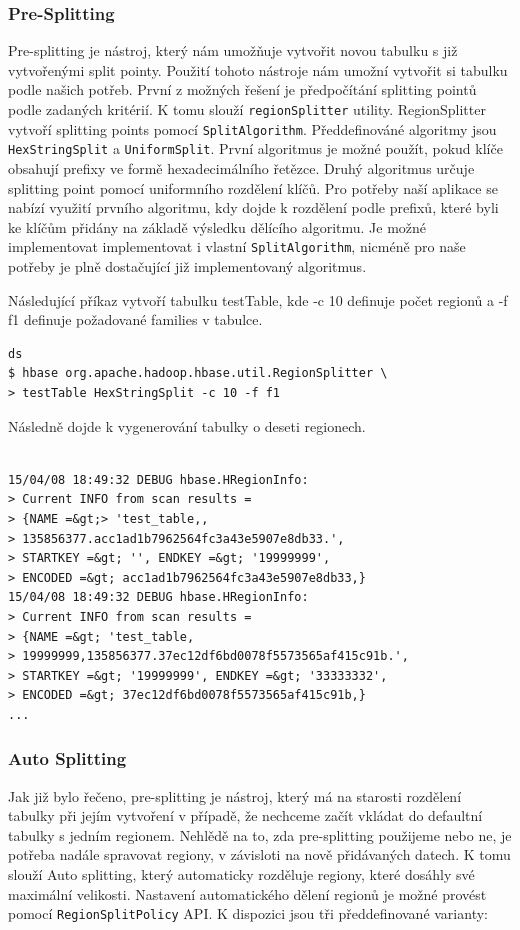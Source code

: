 \documentclass[thesis=M,czech]{FITthesis}[2012/06/26]
\begin{document}
\subsubsection{Pre-Splitting}
Pre-splitting je nástroj, který nám umožňuje vytvořit novou tabulku s již vytvořenými split pointy. Použití tohoto nástroje nám umožní vytvořit si tabulku podle našich potřeb. První z možných řešení je předpočítání splitting pointů podle zadaných kritérií. K tomu slouží \texttt{regionSplitter} utility. RegionSplitter vytvoří splitting points pomocí \texttt{SplitAlgorithm}. Předdefinováné algoritmy jsou \texttt{HexStringSplit} a \texttt{UniformSplit}. První algoritmus je možné použít, pokud klíče obsahují prefixy ve formě hexadecimálního řetězce. Druhý algoritmus určuje splitting point pomocí uniformního rozdělení klíčů. Pro potřeby naší aplikace se nabízí využití prvního algoritmu, kdy dojde k rozdělení podle prefixů, které byli ke klíčům přidány na základě výsledku dělícího algoritmu. Je možné implementovat implementovat i vlastní \texttt{SplitAlgorithm}, nicméně pro naše potřeby je plně dostačující již implementovaný algoritmus.

Následující příkaz vytvoří tabulku testTable, kde -c 10 definuje počet regionů a -f f1 definuje požadované families v tabulce.

\medskip
\begin{lstlisting}[frame=single]  % Start your code-block
ds
$ hbase org.apache.hadoop.hbase.util.RegionSplitter \
> testTable HexStringSplit -c 10 -f f1

\end{lstlisting}
\medskip
Následně dojde k vygenerování tabulky o deseti regionech.
\medskip
\begin{lstlisting}[frame=single]  % Start your code-block
 
15/04/08 18:49:32 DEBUG hbase.HRegionInfo:
> Current INFO from scan results = 
> {NAME =&gt;> 'test_table,,
> 135856377.acc1ad1b7962564fc3a43e5907e8db33.', 
> STARTKEY =&gt; '', ENDKEY =&gt; '19999999', 
> ENCODED =&gt; acc1ad1b7962564fc3a43e5907e8db33,}
15/04/08 18:49:32 DEBUG hbase.HRegionInfo: 
> Current INFO from scan results = 
> {NAME =&gt; 'test_table,
> 19999999,135856377.37ec12df6bd0078f5573565af415c91b.', 
> STARTKEY =&gt; '19999999', ENDKEY =&gt; '33333332', 
> ENCODED =&gt; 37ec12df6bd0078f5573565af415c91b,}
...

\end{lstlisting}
\medskip
\subsubsection{Auto Splitting}
Jak již bylo řečeno, pre-splitting je nástroj, který má na starosti rozdělení tabulky při jejím vytvoření v případě, že nechceme začít vkládat do defaultní tabulky s jedním regionem. Nehlědě na to, zda pre-splitting použijeme nebo ne, je potřeba nadále spravovat regiony, v závisloti na nově přidávaných datech. K tomu slouží Auto splitting, který automaticky rozděluje regiony, které dosáhly své maximální velikosti. Nastavení automatického dělení regionů je možné provést pomocí \texttt{RegionSplitPolicy} API. K dispozici jsou tři předdefinované varianty:
\end{document}
